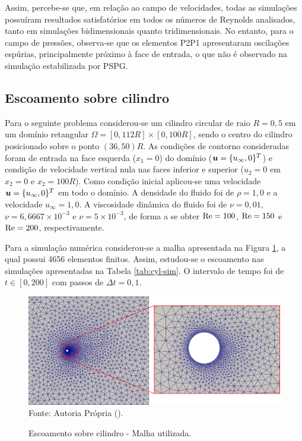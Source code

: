 Assim, percebe-se que, em relação ao campo de velocidades, todas as simulações possuíram resultados satisfatórios em todos os números de Reynolds analisados, tanto em simulações bidimensionais quanto tridimensionais. No entanto, para o campo de pressões, observa-se que os elementos P2P1 apresentaram oscilações espúrias, principalmente próximo à face de entrada, o que não é observado na simulação estabilizada por PSPG.

\subsection{Escoamento sobre cilindro} \label{ex:cylinder}

Para o seguinte problema considerou-se um cilindro circular de raio $R=0,5$ em um domínio retangular $\Omega=[0,112R]\times[0,100R]$, sendo o centro do cilindro posicionado sobre o ponto $(36,50)R$. As condições de contorno consideradas foram de entrada na face esquerda ($x_1=0$) do domínio ($\boldsymbol{u}=\{u_\infty,0\}^T$) e condição de velocidade vertical nula nas faces inferior e superior ($u_2=0$ em $x_2=0$ e $x_2=100R$). Como condição inicial aplicou-se uma velocidade $\boldsymbol{u}=\{u_\infty,0\}^T$ em todo o domínio. A densidade do fluido foi de $\rho=1,0$ e a velocidade $u_\infty=1,0$. A viscosidade dinâmica do fluido foi de $\nu=0,01$, $\nu=6,6667\times10^{-3}$ e $\nu=5\times10^{-3}$, de forma a se obter $\mathrm{Re}=100$, $\mathrm{Re}=150$ e $\mathrm{Re}=200$, respectivamente.

Para a simulação numérica considerou-se a malha apresentada na Figura \ref{fig:cyl-mesh}, a qual possui 4656 elementos finitos. Assim, estudou-se o escoamento nas simulações apresentadas na Tabela \ref{tab:cyl-sim}. O intervalo de tempo foi de $t\in[0,200]$ com passos de $\Delta t=0,1$.

\begin{figure}[h!]
    \centering
    \caption{Escoamento sobre cilindro - Malha utilizada.}
    \includegraphics[width=\linewidth]{Figuras/cylinder/analise2/mesh.png}
    \\Fonte: Autoria Própria (\the\year).
    \label{fig:cyl-mesh}
\end{figure}


